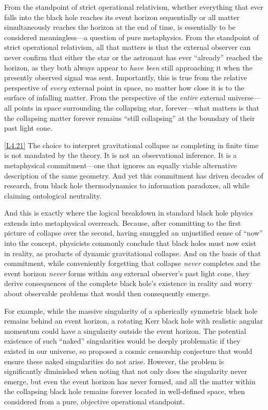\documentclass[12pt]{book}
\newcounter{logicanchor}
\newenvironment{logicanchorenv}[1]{\refstepcounter{logicanchor}\label{#1}}{}
\newcommand{\logiclink}[2]{\begin{logicanchorenv}{logic:#1}\end{logicanchorenv}\hyperref[appendix:#1]{[#1]}\xspace}
\begin{document}
From the standpoint of strict operational relativism, whether everything that ever falls into the black hole reaches its event horizon sequentially or all matter simultaneously reaches the horizon at the end of time, is essentially to be considered meaningless---a question of pure metaphysics. From the standpoint of strict operational relativism, all that matters is that the external observer can never confirm that either the star or the astronaut has ever ``already'' reached the horizon, as they both always appear to \textit{have been} still approaching it when the presently observed signal was sent. Importantly, this is true from the relative perspective of \textit{every} external point in space, no matter how close it is to the surface of infalling matter. From the perspective of the \textit{entire} external universe---all points in space surrounding the collapsing star, forever---what matters is that the collapsing matter forever remains ``still collapsing'' at the boundary of their past light cone.

\logiclink{L4.21}{} The choice to interpret gravitational collapse as completing in finite time is not mandated by the theory. It is not an observational inference. It is a metaphysical commitment---one that ignores an equally viable alternative description of the same geometry. And yet this commitment has driven decades of research, from black hole thermodynamics to information paradoxes, all while claiming ontological neutrality.

And this is exactly where the logical breakdown in standard black hole physics extends into metaphysical overreach. Because, after committing to the first picture of collapse over the second, having smuggled an unjustified sense of ``now'' into the concept, physicists commonly conclude that black holes must now exist in reality, as products of dynamic gravitational collapse. And on the basis of that commitment, while conveniently forgetting that collapse \textit{never} completes and the event horizon \textit{never} forms within \textit{any} external observer's past light cone, they derive consequences of the complete black hole's existence in reality and worry about observable problems that would then consequently emerge.

For example, while the massive singularity of a spherically symmetric black hole remains behind an event horizon, a rotating Kerr black hole with realistic angular momentum could have a singularity outside the event horizon. The potential existence of such ``naked'' singularities would be deeply problematic if they existed in our universe, so \citet{Penrose1969} proposed a cosmic censorship conjecture that would ensure these naked singularities do not arise. However, the problem is significantly diminished when noting that not only does the singularity never emerge, but even the event horizon has never formed, and all the matter within the collapsing black hole remains forever located in well-defined space, when considered from a pure, objective operational standpoint.
\end{document}
